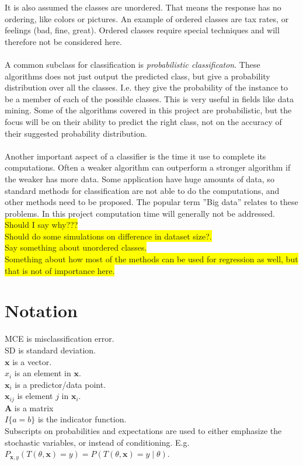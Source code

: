 It is also assumed the classes are unordered. That means the response has no ordering, like colors or pictures. An example of ordered classes are tax rates, or feelings (bad, fine, great). Ordered classes require special techniques and will therefore not be considered here. 
\\
\\
A common subclass for classification is \textit{probabilistic classificaton}. These algorithms does not just output the predicted class, but give a probability distribution over all the classes. I.e. they give the probability of the instance to be a member of each of the possible classes. This is very useful in fields like data mining. 
Some of the algorithms covered in this project are probabilistic, but the focus will be on their ability to predict the right class, not on the accuracy of their suggested probability distribution.
\\
\\
Another important aspect of a classifier is the time it use to complete its computations. Often a weaker algorithm can outperform a stronger algorithm if the weaker has more data. Some application have huge amounts of data, so standard methods for classification are not able to do the computations, and other methods need to be proposed. The popular term ''Big data'' relates to these problems. In this project computation time will generally not be addressed. \colorbox{yellow}{Should I say why???}
\\

\colorbox{yellow}{Should do some simulations on difference in dataset size?.}\\
\colorbox{yellow}{Say something about unordered classes.}\\
\colorbox{yellow}{Something about how most of the methods can be used for regression as well, but that is not of importance here.}


\section{Notation}
\label{sec:Notation}
MCE is misclassification error. \\
SD is standard deviation. \\
$\mathbf{x}$ is a vector. \\
$x_i$ is an element in $\mathbf{x}$. \\
$\mathbf{x}_i$ is a predictor/data point.  \\
$\mathbf{x}_{ij}$ is element $j$ in $\mathbf{x}_i$. \\
$\mathbf{A}$ is a matrix \\
$I\{a = b\}$ is the indicator function.\\
Subscripts on probabilities and expectations are used to either emphasize the stochastic variables, or instead of conditioning. 
E.g. $P_{\mathbf{x}, y}(T(\theta, \mathbf{x}) = y) = P(T(\theta, \mathbf{x}) = y \mid \theta)$.

